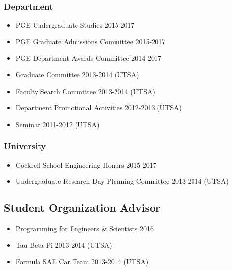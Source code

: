 \subsubsection*{Department}
\begin{itemize}
    \item PGE Undergraduate Studies 2015-2017
    \item PGE Graduate Admissions Committee 2015-2017
    \item PGE Department Awards Committee 2014-2017
    \item Graduate Committee 2013-2014 (UTSA)
    \item Faculty Search Committee 2013-2014 (UTSA)
    \item Department Promotional Activities 2012-2013 (UTSA)
    \item Seminar 2011-2012 (UTSA)
\end{itemize}

\subsubsection*{University}
\begin{itemize}
    \item Cockrell School Engineering Honors 2015-2017
    \item Undergraduate Research Day Planning Committee 2013-2014 (UTSA)
\end{itemize}

\subsection*{Student Organization Advisor}
\begin{itemize}
    \item Programming for Engineers \& Scientists 2016
    \item Tau Beta Pi 2013-2014 (UTSA)
    \item Formula SAE Car Team 2013-2014 (UTSA)
\end{itemize}
